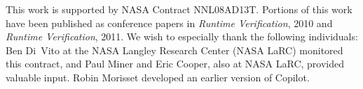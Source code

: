 \documentclass[twocolumn]            %
{report-templates/svjour3}                       %
\begin{document}


\begin{acknowledgements}
This work is supported by NASA Contract NNL08AD13T.  Portions
  of this work have been published as conference papers in \emph{Runtime
    Verification}, 2010 and  \emph{Runtime
    Verification}, 2011.  We wish to especially thank the following individuals:
  Ben Di~Vito at the NASA Langley Research Center (NASA LaRC) monitored this
  contract, and Paul Miner and Eric Cooper, also at NASA LaRC, provided valuable
  input.  Robin Morisset developed an earlier version of Copilot.
\end{acknowledgements}


                          

\end{document}
